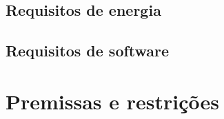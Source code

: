 \subsection{Requisitos de energia}
\subsection{Requisitos de software}

\section{Premissas e restrições}
